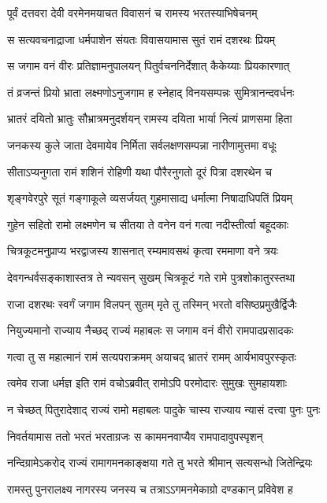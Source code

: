 \twolineshloka
{पूर्वं दत्तवरा देवी वरमेनमयाचत}
{विवासनं च रामस्य भरतस्याभिषेचनम्}%

\twolineshloka
{स सत्यवचनाद्राजा धर्मपाशेन संयतः}
{विवासयामास सुतं रामं दशरथः प्रियम्}%

\twolineshloka
{स जगाम वनं वीरः प्रतिज्ञामनुपालयन्}
{पितुर्वचननिर्देशात् कैकेय्याः प्रियकारणात्}%

\twolineshloka
{तं व्रजन्तं प्रियो भ्राता लक्ष्मणोऽनुजगाम ह}
{स्नेहाद् विनयसम्पन्नः सुमित्रानन्दवर्धनः}%

\twolineshloka
{भ्रातरं दयितो भ्रातुः सौभ्रात्रमनुदर्शयन्}
{रामस्य दयिता भार्या नित्यं प्राणसमा हिता}%

\twolineshloka
{जनकस्य कुले जाता देवमायेव निर्मिता}
{सर्वलक्षणसम्पन्ना नारीणामुत्तमा वधूः}%

\twolineshloka
{सीताऽप्यनुगता रामं शशिनं रोहिणी यथा}
{पौरैरनुगतो दूरं पित्रा दशरथेन च}%

\twolineshloka
{शृङ्गवेरपुरे सूतं गङ्गाकूले व्यसर्जयत्}
{गुहमासाद्य धर्मात्मा निषादाधिपतिं प्रियम्}%

\twolineshloka
{गुहेन सहितो रामो लक्ष्मणेन च सीतया}
{ते वनेन वनं गत्वा नदीस्तीर्त्वा बहूदकाः}%

\twolineshloka
{चित्रकूटमनुप्राप्य भरद्वाजस्य शासनात्}
{रम्यमावसथं कृत्वा रममाणा वने त्रयः}%

\twolineshloka
{देवगन्धर्वसङ्काशास्तत्र ते न्यवसन् सुखम्}
{चित्रकूटं गते रामे पुत्रशोकातुरस्तथा}%

\twolineshloka
{राजा दशरथः स्वर्गं जगाम विलपन् सुतम्}
{मृते तु तस्मिन् भरतो वसिष्ठप्रमुखैर्द्विजैः}%

\twolineshloka
{नियुज्यमानो राज्याय नैच्छद् राज्यं महाबलः}
{स जगाम वनं वीरो रामपादप्रसादकः}%

\twolineshloka
{गत्वा तु स महात्मानं रामं सत्यपराक्रमम्}
{अयाचद् भ्रातरं रामम् आर्यभावपुरस्कृतः}%

\twolineshloka
{त्वमेव राजा धर्मज्ञ इति रामं वचोऽब्रवीत्}
{रामोऽपि परमोदारः सुमुखः सुमहायशाः}%

\twolineshloka
{न चेच्छत् पितुरादेशाद् राज्यं रामो महाबलः}
{पादुके चास्य राज्याय न्यासं दत्त्वा पुनः पुनः}%

\twolineshloka
{निवर्तयामास ततो भरतं भरताग्रजः}
{स काममनवाप्यैव रामपादावुपस्पृशन्}%

\twolineshloka
{नन्दिग्रामेऽकरोद् राज्यं रामागमनकाङ्क्षया}
{गते तु भरते श्रीमान् सत्यसन्धो जितेन्द्रियः}%

\twolineshloka
{रामस्तु पुनरालक्ष्य नागरस्य जनस्य च}
{तत्राऽऽगमनमेकाग्रो दण्डकान् प्रविवेश ह}%

